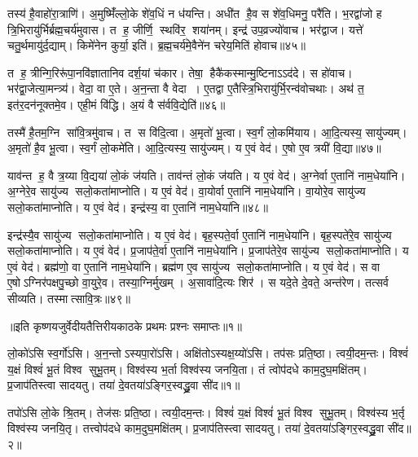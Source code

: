    तस्य॑ है॒वाहो॑रा॒त्राणि॑।
   अ॒मुष्मिँ॑ल्लो॒के शे॑व॒धिं न ध॑यन्ति।
   अधी॑त है॒व स शे॑व॒धिमनु॒ परै॑ति।
   भ॒रद्वा॑जो ह त्रि॒भिरायु॑र्भिर्ब्रह्म॒चर्य॑मुवास।
   त ह॒ जीर्णि॒ स्थवि॑र॒ शया॑नम्।
   इन्द्र॑ उप॒व्रज्यो॑वाच।
   भर॑द्वाज।
   यत्ते॑ चतु॒र्थमायु॑र्द॒द्याम्।
   किमे॑नेन कुर्या॒ इति॑।
   ब्र॒ह्म॒चर्य॑मे॒वैने॑न चरेय॒मिति॑ होवाच॥४५॥

   त ह॒ त्रीन्गि॒रिरू॑पा॒नवि॑ज्ञातानिव दर्\mbox{}श॒यां च॑कार।
   तेषा॒ हैकै॑कस्मान्मु॒ष्टिनाऽऽद॑दे।
   स हो॑वाच।
   भर॑द्वा॒जेत्या॒मन्त्र्य॑।
   वेदा॒ वा ए॒ते।
   अ॒न॒न्ता वै वेदा।
   ए॒तद्वा ए॒तैस्त्रि॒भिरायु॑र्भि॒रन्व॑वोचथाः।
   अथ॑ त॒ इत॑र॒दन॑नूक्तमे॒व।
   एही॒मं वि॑द्धि।
   अ॒यं वै स॑र्ववि॒द्येति॑॥४६॥

   तस्मै॑ है॒तम॒ग्नि सा॑वि॒त्रमु॑वाच।
   त स वि॑दि॒त्वा।
   अ॒मृतो॑ भू॒त्वा।
   स्व॒र्गं लो॒कमि॑याय।
   आ॒दि॒त्यस्य॒ सायु॑ज्यम्।
   अ॒मृतो॑ है॒व भू॒त्वा।
   स्व॒र्गं लो॒कमे॑ति।
   आ॒दि॒त्यस्य॒ सायु॑ज्यम्।
   य ए॒वं वेद॑।
   ए॒षो ए॒व त्रयी॑ वि॒द्या॥४७॥

   याव॑न्त ह॒ वै त्र॒य्या वि॒द्यया॑ लो॒कं ज॑यति।
   ताव॑न्तं लो॒कं ज॑यति।
   य ए॒वं वेद॑।
   अ॒ग्नेर्वा ए॒तानि॑ नाम॒धेया॑नि।
   अ॒ग्नेरे॒व सायु॑ज्य सलो॒कता॑माप्नोति।
   य ए॒वं वेद॑।
   वा॒योर्वा ए॒तानि॑ नाम॒धेया॑नि।
   वा॒योरे॒व सायु॑ज्य सलो॒कता॑माप्नोति।
   य ए॒वं वेद॑।
   इन्द्र॑स्य॒ वा ए॒तानि॑ नाम॒धेया॑नि॥४८॥

   इन्द्र॑स्यै॒व सायु॑ज्य सलो॒कता॑माप्नोति।
   य ए॒वं वेद॑।
   बृह॒स्पते॒र्वा ए॒तानि॑ नाम॒धेया॑नि।
   बृह॒स्पते॑रे॒व सायु॑ज्य सलो॒कता॑माप्नोति।
   य ए॒वं वेद॑।
   प्र॒जाप॑ते॒र्वा ए॒तानि॑ नाम॒धेया॑नि।
   प्र॒जाप॑तेरे॒व सायु॑ज्य सलो॒कता॑माप्नोति।
   य ए॒वं वेद॑।
   ब्रह्म॑णो॒ वा ए॒तानि॑ नाम॒धेया॑नि।
   ब्रह्म॑ण ए॒व सायु॑ज्य सलो॒कता॑माप्नोति।
   य ए॒वं वेद॑।
   स वा ए॒षोऽग्निर॑पक्षपु॒च्छो वा॒युरे॒व।
   तस्या॒ग्निर्मुखम्।
   अ॒सावा॑दि॒त्यः शिर॑।
   स यदे॒ते दे॒वते॒ अन्त॑रेण।
   तत्सर्व सीव्यति।
   तस्मात्सावि॒त्रः॥४९॥
   \anuvakamend
   
॥इति कृष्णयजुर्वेदीयतैत्तिरीयकाठके प्रथमः प्रश्नः समाप्तः॥१॥

\setcounter{anuvakam}{0}

   लो॒को॑ऽसि स्व॒र्गो॑ऽसि।
   अ॒न॒न्तोऽस्यपा॒रो॑ऽसि।
   अक्षि॑तो\-ऽस्यक्ष॒य्यो॑\-ऽसि।
   तप॑सः प्रति॒ष्ठा।
   त्वयी॒दम॒न्तः।
   विश्वं॑ य॒क्षं विश्वं॑ भू॒तं विश्व सुभू॒तम्।
   विश्व॑स्य भ॒र्ता विश्व॑स्य जनयि॒ता।
   तं त्वोप॑दधे काम॒दुघ॒मक्षि॑तम्।
   प्र॒जाप॑तिस्त्वा सादयतु।
   तया॑ दे॒वतया॑ऽङ्गिर॒स्वद्ध्रु॒वा सी॑द॥१॥

   तपो॑ऽसि लो॒के श्रि॒तम्।
   तेज॑सः प्रति॒ष्ठा।
   त्वयी॒दम॒न्तः।
   विश्वं॑ य॒क्षं विश्वं॑ भू॒तं विश्व सुभू॒तम्।
   विश्व॑स्य भ॒र्तृ विश्व॑स्य जनयि॒तृ।
   तत्त्वोप॑दधे काम॒दुघ॒मक्षि॑तम्।
   प्र॒जाप॑तिस्त्वा सादयतु।
   तया॑ दे॒वतया॑ऽङ्गिर॒स्वद्ध्रु॒वा सी॑द॥२॥

